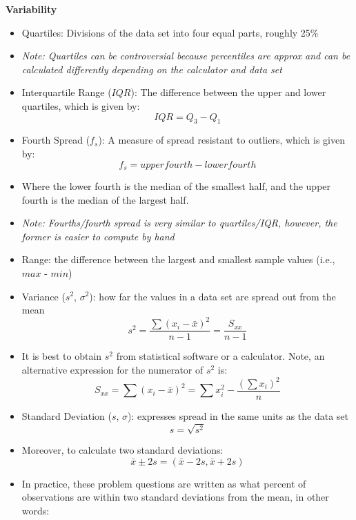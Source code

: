 \documentclass[12pt]{article}
\begin{document}
    \noindent \textbf{Variability}
    \begin{itemize}
        \item Quartiles: Divisions of the data set into four equal parts, roughly 25\%
        \item[] \textit{Note: Quartiles can be controversial because percentiles are approx and can be calculated differently depending on the calculator and data set} 
        \item Interquartile Range ($IQR$): The difference between the upper and lower quartiles, which is given by:
        \[
        IQR = Q_3 - Q_1
        \]
        \item Fourth Spread ($f_s$): A measure of spread resistant to outliers, which is given by:
        \[
        f_s = upper fourth - lower fourth
        \]
        \item[] Where the lower fourth is the median of the smallest half, and the upper fourth is the median of the largest half.
        \item[] \textit{Note: Fourths/fourth spread is very similar to quartiles/IQR, however, the former is easier to compute by hand}
        \item Range: the difference between the largest and smallest sample values (i.e., $max$ - $min$)
        \item Variance ($s^2$, $\sigma^2$): how far the values in a data set are spread out from the mean
        \[
        s^2 = \frac{\sum (x_i - \bar{x})^2}{n - 1} = \frac{S_{xx}}{n - 1}
        \]
        \item[] It is best to obtain $s^2$ from statistical software or a calculator. Note, an alternative expression for the numerator of $s^2$ is:
        \[
        S_{xx} = \sum (x_i - \bar{x})^2 = \sum x_i^2 - \frac{(\sum x_i)^2}{n} 
        \]
        \item Standard Deviation ($s$, $\sigma$): expresses spread in the same units as the data set
        \[
        s = \sqrt{s^2}
        \]
        \item[] Moreover, to calculate two standard deviations:
        \[
        \bar{x} \pm 2s = (\bar{x} - 2s, \bar{x} + 2s)
        \]
        \item[] In practice, these problem questions are written as what percent of observations are within two standard deviations from the mean, in other words:

\end{itemize}
\end{document}
